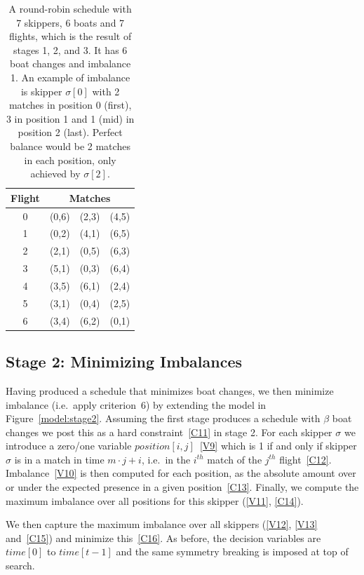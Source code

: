 \documentclass{llncs}
\newcommand{\timeVar}{\mathit{time}}
\begin{document}
{\begin{table}
    \setlength{\tabcolsep}{3pt}
    \begin{tabular}{cccc}
        \toprule
        Flight & \multicolumn{3}{c}{Matches} \\ \midrule
        0 & (0,6) & (2,3) & (4,5) \\
        1 & (0,2) & (4,1) & (6,5) \\
        2 & (2,1) & (0,5) & (6,3) \\
        3 & (5,1) & (0,3) & (6,4) \\
        4 & (3,5) & (6,1) & (2,4) \\
        5 & (3,1) & (0,4) & (2,5) \\
        6 & (3,4) & (6,2) & (0,1) \\ \bottomrule
    \end{tabular}
    \caption{A round-robin schedule with 7 skippers, 6 boats and 7 flights, which is the result of
        stages 1, 2, and 3. It has 6 boat changes and imbalance 1. An example of imbalance is
        skipper $\sigma[{0}]$ with 2 matches in position 0 (first), 3 in position 1 and 1 (mid) in
        position 2 (last). Perfect balance would be 2 matches in each position, only achieved by
        $\sigma[{2}]$.}\label{tab2}
\end{table}
\clearpage %
}

\subsection{Stage 2: Minimizing Imbalances}
Having produced a schedule that minimizes boat changes, we then minimize imbalance (i.e.\ apply
criterion~6) by extending the model in Figure~\ref{model:stage2}.  Assuming the first stage
produces a schedule with $\beta$ boat changes we post this as a hard constraint~\eqref{C11} in stage
2. For each skipper $\sigma$ we introduce a zero/one variable $position[{i,j}]$~\eqref{V9} which is
1 if and only if skipper $\sigma$ is in a match in time $m \cdot j + i$, i.e.\ in the $i^{th}$ match
of the  $j^{th}$ flight~\eqref{C12}. Imbalance~\eqref{V10} is then computed for each position, as
the absolute amount over or under the expected presence in a given position~\eqref{C13}. Finally, we
compute the maximum imbalance over all positions for this skipper (\ref{V11}, \ref{C14}).

We then capture the maximum imbalance over all skippers (\ref{V12}, \ref{V13} and~\ref{C15}) and
minimize this~\eqref{C16}. As before, the decision variables are $\timeVar[{0}]$ to
$\timeVar[{t-1}]$ and the same symmetry breaking is imposed at top of search.
\end{document}
